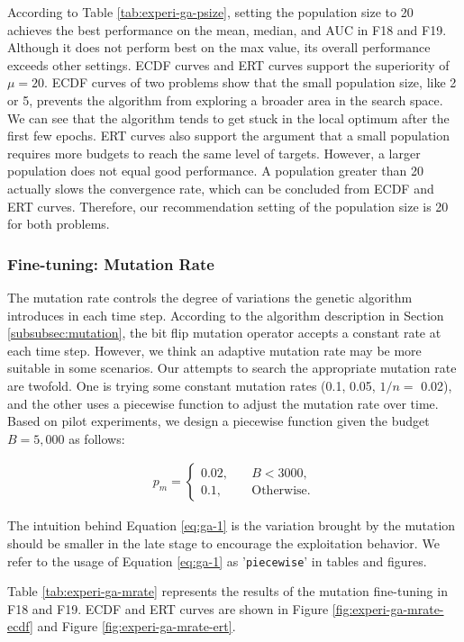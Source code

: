 \documentclass{article}
\begin{document}
According to Table \ref{tab:experi-ga-psize}, setting the population size to 20 achieves the best performance on the mean, median, and AUC in F18 and F19. Although it does not perform best on the max value, its overall performance exceeds other settings. ECDF curves and ERT curves support the superiority of $\mu = 20$. ECDF curves of two problems show that the small population size, like 2 or 5, prevents the algorithm from exploring a broader area in the search space. We can see that the algorithm tends to get stuck in the local optimum after the first few epochs. ERT curves also support the argument that a small population requires more budgets to reach the same level of targets. However, a larger population does not equal good performance. A population greater than 20 actually slows the convergence rate, which can be concluded from ECDF and ERT curves. Therefore, our recommendation setting of the population size is 20 for both problems.

\subsubsection{Fine-tuning: Mutation Rate}
The mutation rate controls the degree of variations the genetic algorithm introduces in each time step. According to the algorithm description in Section \ref{subsubsec:mutation}, the bit flip mutation operator accepts a constant rate at each time step. However, we think an adaptive mutation rate may be more suitable in some scenarios. Our attempts to search the appropriate mutation rate are twofold. One is trying some constant mutation rates (0.1, 0.05, $1/n=$ 0.02), and the other uses a piecewise function to adjust the mutation rate over time. Based on pilot experiments, we design a piecewise function given the budget $B = 5,000$ as follows:

\begin{align}
    p_m = 
    \begin{cases}
        0.02,\quad & B < 3000,\\
        0.1,\quad &\text{Otherwise}.
    \end{cases}
    \label{eq:ga-1}
\end{align}

The intuition behind Equation \ref{eq:ga-1} is the variation brought by the mutation should be smaller in the late stage to encourage the exploitation behavior. We refer to the usage of Equation \ref{eq:ga-1} as '\texttt{piecewise}' in tables and figures.

Table \ref{tab:experi-ga-mrate} represents the results of the mutation fine-tuning in F18 and F19. ECDF and ERT curves are shown in Figure \ref{fig:experi-ga-mrate-ecdf} and Figure \ref{fig:experi-ga-mrate-ert}.
\end{document}
